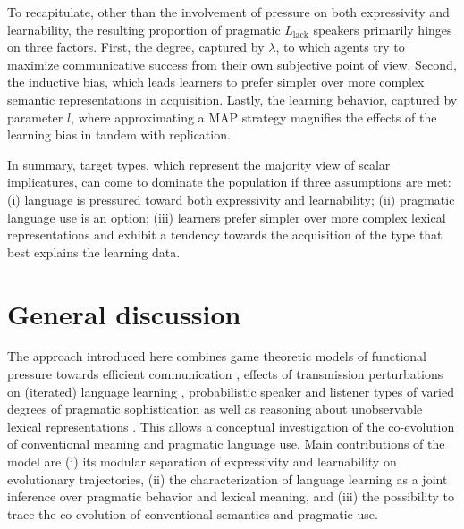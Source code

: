 \documentclass[a4paper, 11pt]{article}
\theoremstyle{Satz}
\newcommand{\mylang}[1]{\ensuremath{L_{\text{#1}}}\xspace} %
\newcommand{\Llack}{\mylang{lack}}
\begin{document}
To recapitulate, other than the involvement of pressure on both expressivity and learnability,
the resulting proportion of pragmatic $\Llack$ speakers primarily hinges on three
factors. First, the degree, captured by $\lambda$, to which agents try to maximize
communicative success from their own subjective point of view. Second, the inductive bias,
which leads learners to prefer simpler over more complex semantic representations in
acquisition. Lastly, the learning behavior, captured by parameter $l$, where approximating a
MAP strategy magnifies the effects of the learning bias in tandem with replication.

In summary, target types, which represent the majority view of scalar implicatures, can come to
dominate the population if three assumptions are met: (i) language is pressured toward both
expressivity and learnability; (ii) pragmatic language use is an option; (iii) learners prefer
simpler over more complex lexical representations and exhibit a tendency towards the
acquisition of the type that best explains the learning data.


\section{General discussion}\label{sec:discussion}

The approach introduced here combines game theoretic models of functional pressure towards
efficient communication \citep{nowak+krakauer:1999}, effects of transmission perturbations on
(iterated) language learning \citep{griffiths+kalish:2007}, probabilistic speaker and listener
types of varied degrees of pragmatic sophistication \citep{frank+goodman:2012,
  franke+jaeger:2014} as well as reasoning about unobservable lexical representations
\citep{bergen+etal:2012,bergen+etal:2016}. This allows a conceptual investigation of the
co-evolution of conventional meaning and pragmatic language use. Main contributions of the
model are (i) its modular separation of expressivity and learnability on evolutionary
trajectories, (ii) the characterization of language learning as a joint inference over
pragmatic behavior and lexical meaning, and (iii) the possibility to trace the co-evolution of
conventional semantics and pragmatic use.
\end{document}
